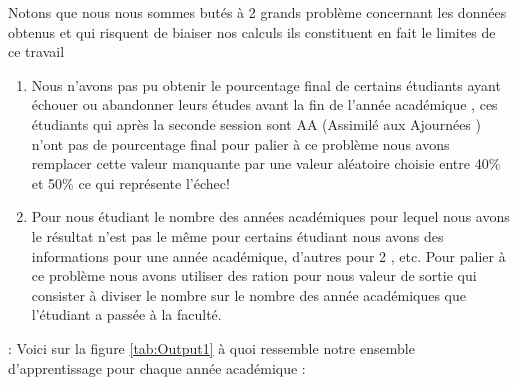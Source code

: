  Notons que nous nous sommes butés à 2 grands problème concernant les
 données obtenus et qui risquent de biaiser nos calculs ils constituent en fait le limites de ce travail 
 \begin{enumerate}
 	\item Nous n'avons
 	pas pu obtenir le pourcentage final de certains étudiants ayant échouer
 	ou abandonner leurs études avant la fin de l'année académique , ces
 	étudiants qui après la seconde session sont AA (Assimilé aux Ajournées )
 	n'ont pas de pourcentage final pour palier à ce problème nous avons
 	remplacer cette valeur manquante par une valeur aléatoire choisie entre
 	40\% et 50\%   ce qui représente l'échec!
 	\item  Pour nous étudiant le
 	nombre des années académiques pour lequel nous avons le résultat n'est
 	pas le même pour certains étudiant nous avons des informations pour une 
 	année académique, d'autres pour 2 , etc. Pour palier à ce problème nous
 	avons utiliser des ration pour nous valeur de sortie qui consister à
 	diviser le nombre sur le nombre des année académiques que l'étudiant a
 	passée à la faculté.
 \end{enumerate}:
  Voici sur la figure \ref{tab:Output1} à  quoi ressemble notre ensemble d'apprentissage pour chaque année académique :
